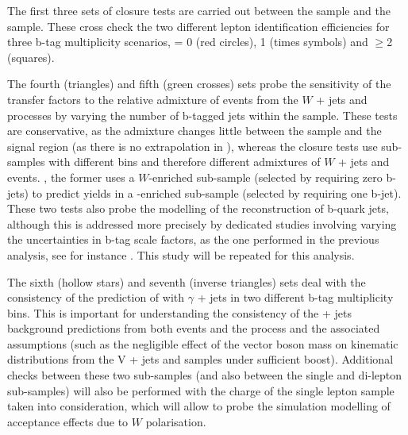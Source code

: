 The first three sets of closure tests are carried out between the \mj
sample and the \ej sample. These cross check the two different lepton
identification efficiencies for three b-tag multiplicity scenarios,
\njet = 0 (red circles), 1 (times symbols) and $\geq$2 (squares).

The fourth (triangles) and fifth (green crosses) sets probe the
sensitivity of the transfer factors to the relative admixture of
events from the $W$ + jets and \ttbar processes by varying the number
of b-tagged jets within the \mj sample. These tests are conservative,
as the admixture changes little between the \mj sample and the signal
region (as there is no extrapolation in \nb), whereas the closure
tests use sub-samples with different \nb bins and therefore different
admixtures of $W$ + jets and \ttbar events. \eg, the former uses a
$W$-enriched sub-sample (selected by requiring zero b-jets) to predict
yields in a \ttbar-enriched sub-sample (selected by requiring one
b-jet).  These two tests also probe the modelling of the
reconstruction of b-quark jets, although this is addressed more
precisely by dedicated studies involving varying the uncertainties in
b-tag scale factors, as the one performed in the previous analysis,
see for instance \cite{CMS_AN_2013-366}. This study will be repeated
for this analysis.

The sixth (hollow stars) and seventh (inverse triangles) sets deal with
the consistency of the prediction of \wej with $\gamma$ + jets in two
different b-tag multiplicity bins. This is important for understanding
the consistency of the \znunu + jets background predictions from both
\wej events and the \gj process and the associated assumptions (such
as the negligible effect of the vector boson mass on kinematic
distributions from the V + jets and \gj samples under sufficient
boost). Additional checks between these two sub-samples (and also
between the single and di-lepton sub-samples) will also be performed
with the charge of the single lepton sample taken into consideration,
which will allow to probe the simulation modelling of acceptance
effects due to $W$ polarisation.

